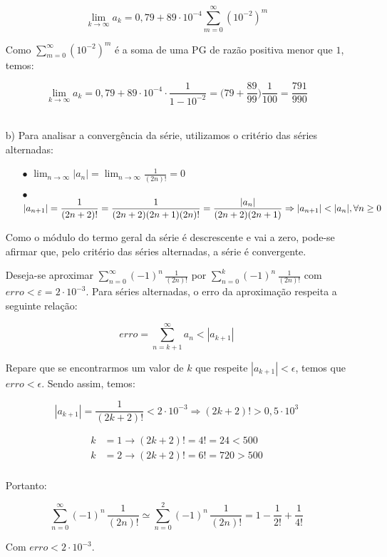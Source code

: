 \documentclass[12pt,a4paper]{article}
\begin{document}
\begin{itemize}
    $$ \lim_{k \rightarrow \infty} a_k = 0,79 + 89 \cdot 10^{-4} \sum_{m=0}^{\infty} (10^{-2})^m $$
    
    Como $\displaystyle\sum_{m=0}^{\infty} (10^{-2})^m$ é a soma de uma PG de razão positiva menor que $1$, temos:
    
    $$ \lim_{k \rightarrow \infty} a_k = 0,79 + 89 \cdot 10^{-4} \cdot \frac{1}{1 - 10^{-2}} = \Big(79 + \frac{89}{99} \Big) \frac{1}{100} = \frac{791}{990} $$ \\



    \item[b)] Para analisar a convergência da série, utilizamos o critério das séries alternadas:
    
    \begin{itemize}
    \item[$\bullet$] $\displaystyle\lim_{n \rightarrow \infty} |a_n| = \lim_{n \rightarrow \infty} \displaystyle\frac{1}{(2n)!} = 0 $
    \item[$\bullet$] $|a_{n+1}| = \displaystyle\frac{1}{(2n+2)!} = \displaystyle\frac{1}{(2n+2)(2n+1)(2n)!} = \frac{|a_n|}{(2n+2)(2n+1)} \\ \Rightarrow |a_{n+1}| < |a_n|, \forall n \geq 0  $
    \end{itemize}
    
    Como o módulo do termo geral da série é descrescente e vai a zero, pode-se afirmar que, pelo critério das séries alternadas, a série é convergente.
    
    Deseja-se aproximar $\displaystyle\sum_{n=0}^\infty (-1)^n \, \frac{1}{(2n)!}$ por $\displaystyle\sum_{n=0}^k (-1)^n \, \frac{1}{(2n)!}$  com $erro < \varepsilon = 2\cdot 10^{-3}$.
Para séries alternadas, o erro da aproximação respeita a seguinte relação:

$$ erro = \sum_{n=k+1}^\infty a_n < |a_{k+1}| $$

Repare que se encontrarmos um valor de $k$ que respeite $|a_{k+1}| < \epsilon$, temos que $erro < \epsilon$. Sendo assim, temos:

$$|a_{k+1}| = \frac{1}{(2k+2)!} < 2\cdot 10^{-3} \Rightarrow (2k+2)! > 0,5 \cdot 10^{3} $$

\begin{align*} 
    k &= 1 \rightarrow (2k+2)! = 4! = 24 < 500 \\ 
    k &= 2 \rightarrow (2k+2)! = 6! = 720 > 500 \\
\end{align*}

Portanto: 

$$ \sum_{n=0}^\infty (-1)^n \, \frac{1}{(2n)!}  \simeq \sum_{n=0}^2 (-1)^n \, \frac{1}{(2n)!} = 1 - \frac{1}{2!} + \frac{1}{4!} $$

Com $erro < 2 \cdot 10^{-3}$.
    

\end{itemize}
\ \
\end{document}
